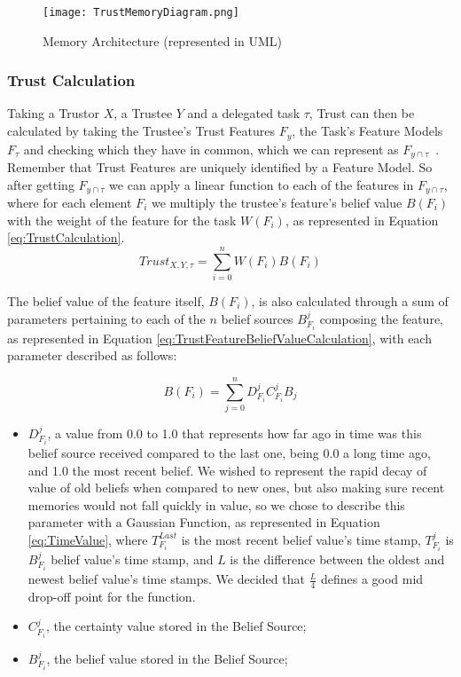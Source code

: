 \begin{figure}[hbt]
    \centering
    \texttt{[image: TrustMemoryDiagram.png]}
    \caption{Memory Architecture (represented in UML)}
    \label{fig:MemoryArchitecture}
\end{figure}


\subsubsection{Trust Calculation}
\label{subsubsec:Trust Calculation}
Taking a Trustor $X$, a Trustee $Y$ and a delegated task $\tau$, Trust can then be calculated by taking the Trustee's Trust Features $F_y$, the Task's Feature Models $F_\tau$ and checking which they have in common, which we can represent as $F_{y\cap\tau}$~. Remember that Trust Features are uniquely identified by a Feature Model. So after getting $F_{y\cap\tau}$ we can apply a linear function to each of the features in $F_{y\cap\tau}$, where for each element $F_i$ we multiply the trustee's feature's belief value $B(F_i)$ with the weight of the feature for the task $W(F_i)$, as represented in Equation \ref{eq:TrustCalculation}.
\begin{equation}
    Trust_{X,Y,\tau}=\sum_{i=0}^{n}W(F_i) B(F_i)
    \label{eq:TrustCalculation}
\end{equation}

The belief value of the feature itself, $B(F_i)$, is also calculated through a sum of parameters pertaining to each of the $n$ belief sources $B_{F_i}^j$ composing the feature, as represented in Equation \ref{eq:TrustFeatureBeliefValueCalculation}, with each parameter described as follows: 

\begin{equation}
B(F_i) = \sum_{j=0}^{n} D^j_{F_i} C^j_{F_i} B_j 
\label{eq:TrustFeatureBeliefValueCalculation}
\end{equation}

\begin{itemize}
    \item $D^j_{F_i}$, a value from 0.0 to 1.0 that represents how far ago in time was this belief source received compared to the last one, being 0.0 a long time ago, and 1.0 the most recent belief. We wished to represent the rapid decay of value of old beliefs when compared to new ones, but also making sure recent memories would not fall quickly in value, so we chose to describe this parameter with a Gaussian Function, as represented in Equation \ref{eq:TimeValue}, where $T^{Last}_{F_i}$ is the most recent belief value's time stamp, $T^j_{F_i}$ is $B_{F_i}^j$ belief value's time stamp, and $L$ is the difference between the oldest and newest belief value's time stamps. We decided that $\frac{L}{4}$ defines a good mid drop-off point for the function.
    \item $C^j_{F_i}$, the certainty value stored in the Belief Source;
    \item $B^j_{F_i}$, the belief value stored in the Belief Source;
\end{itemize}

